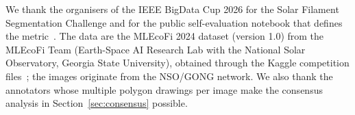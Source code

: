 \documentclass[sigconf]{acmart}
\begin{document}
\begin{acks}
We thank the organisers of the IEEE BigData Cup 2026 for the Solar Filament
Segmentation Challenge and for the public self-evaluation notebook that defines
the metric~\cite{notebook}. The data are the MLEcoFi 2024 dataset (version 1.0)
from the MLEcoFi Team (Earth-Space AI Research Lab with the National
Solar Observatory, Georgia State University), obtained through the Kaggle
competition files~\cite{competition}; the images originate from the
NSO/GONG network. We also thank the annotators whose multiple polygon
drawings per image make the consensus analysis in
Section~\ref{sec:consensus} possible.
\end{acks}



\end{document}
